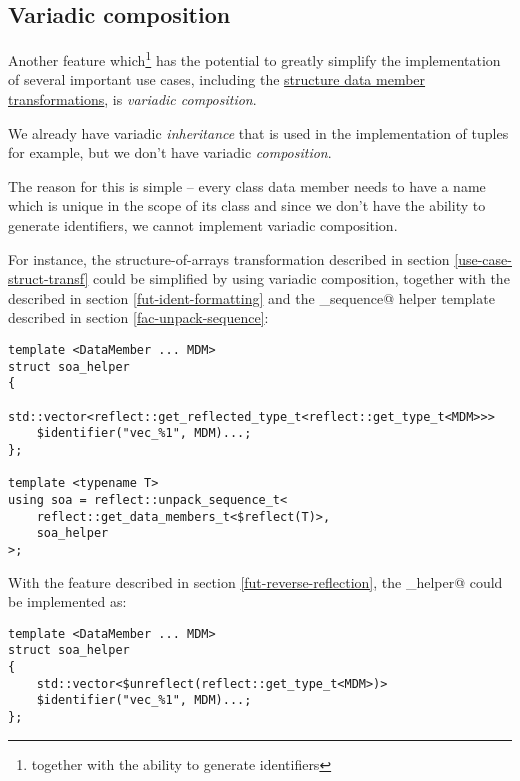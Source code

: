 \subsection{Variadic composition}
\label{fut-variadic-composition}

Another feature which\footnote{together with the ability to generate identifiers}
has the potential to greatly simplify the implementation of several important
use cases, including the \hyperref[use-case-struct-transf]{structure data
member transformations}, is {\em variadic composition}.

We already have variadic {\em inheritance} that is used in the implementation
of tuples for example, but we don't have variadic {\em composition}.

The reason for this is simple -- every class data member needs to have a name
which is unique in the scope of its class and since we don't have the ability
to generate identifiers, we cannot implement variadic composition.

For instance, the structure-of-arrays transformation described in section
\ref{use-case-struct-transf} could be simplified by using variadic composition,
together with the  described in section
\ref{fut-ident-formatting} and the \verb@unpack_sequence@ helper template
described in section \ref{fac-unpack-sequence}:

\begin{verbatim}
template <DataMember ... MDM>
struct soa_helper
{
	std::vector<reflect::get_reflected_type_t<reflect::get_type_t<MDM>>>
	$identifier("vec_%1", MDM)...;
};

template <typename T>
using soa = reflect::unpack_sequence_t<
	reflect::get_data_members_t<$reflect(T)>,
	soa_helper
>;
\end{verbatim}

With the  feature described in section
\ref{fut-reverse-reflection}, the \verb@soa_helper@ could be implemented as:

\begin{verbatim}
template <DataMember ... MDM>
struct soa_helper
{
	std::vector<$unreflect(reflect::get_type_t<MDM>)>
	$identifier("vec_%1", MDM)...;
};
\end{verbatim}
